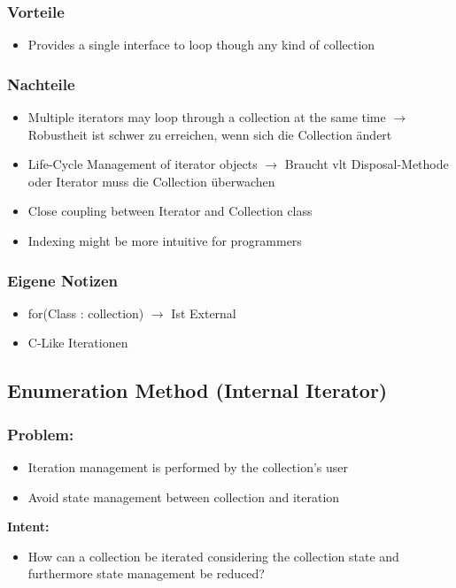 \subsubsection{Vorteile}
\begin{itemize}[topsep=0pt]
    \itemsep -0.4em
    \item Provides a single interface to loop though any kind of collection
\end{itemize}
\subsubsection{Nachteile}
\begin{itemize}[topsep=0pt]
    \itemsep -0.4em
    \item Multiple iterators may loop through a collection at the same time $\rightarrow$ Robustheit ist schwer zu erreichen, wenn sich die Collection ändert
    \item Life-Cycle Management of iterator objects $\rightarrow$ Braucht vlt Disposal-Methode oder Iterator muss die Collection überwachen
    \item Close coupling between Iterator and Collection class
    \item Indexing might be more intuitive for programmers
\end{itemize}
\subsubsection{Eigene Notizen}
\begin{itemize}[topsep=0pt]
    \itemsep -0.4em
    \item for(Class : collection) $\rightarrow$ Ist External
    \item C-Like Iterationen
\end{itemize}

\subsection{Enumeration Method (Internal Iterator)}
\subsubsection{Problem:}
\begin{itemize}[topsep=0pt]
    \itemsep -0.4em
    \item Iteration management is performed by the collection's user
    \item Avoid state management between collection and iteration
\end{itemize}
\textbf{Intent:}
\begin{itemize}[topsep=0pt]
    \itemsep -0.4em
    \item How can a collection be iterated considering the collection state and furthermore state management be reduced?
\end{itemize}
